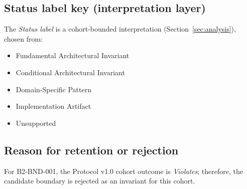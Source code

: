 \subsection{Status label key (interpretation layer)}
The \textit{Status label} is a cohort-bounded interpretation (Section~\ref{sec:analysis}), chosen from:
\begin{itemize}
  \item Fundamental Architectural Invariant
  \item Conditional Architectural Invariant
  \item Domain-Specific Pattern
  \item Implementation Artifact
  \item Unsupported
\end{itemize}

\subsection{Reason for retention or rejection}
For B2-BND-001, the Protocol v1.0 cohort outcome is \emph{Violates}; therefore, the candidate boundary is rejected as an invariant for this cohort.
